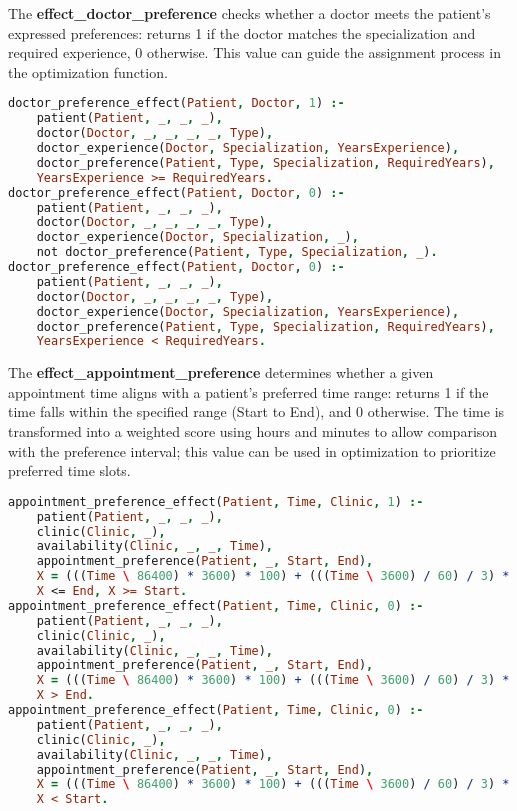 \documentclass{tlp}
\begin{document}
The  \textbf{effect\_doctor\_preference} checks whether a doctor meets the patient's expressed preferences: returns 1 if the doctor matches the specialization and required experience, 0 otherwise. This value can guide the assignment process in the optimization function.

\begin{lstlisting}[language=Prolog, caption=Effect of Patient Preference on Doctor Assignment]
doctor_preference_effect(Patient, Doctor, 1) :-
    patient(Patient, _, _, _), 
    doctor(Doctor, _, _, _, _, Type),
    doctor_experience(Doctor, Specialization, YearsExperience),
    doctor_preference(Patient, Type, Specialization, RequiredYears),
    YearsExperience >= RequiredYears.
doctor_preference_effect(Patient, Doctor, 0) :-
    patient(Patient, _, _, _), 
    doctor(Doctor, _, _, _, _, Type),
    doctor_experience(Doctor, Specialization, _),
    not doctor_preference(Patient, Type, Specialization, _).
doctor_preference_effect(Patient, Doctor, 0) :-
    patient(Patient, _, _, _), 
    doctor(Doctor, _, _, _, _, Type),
    doctor_experience(Doctor, Specialization, YearsExperience),
    doctor_preference(Patient, Type, Specialization, RequiredYears),
    YearsExperience < RequiredYears.
\end{lstlisting}

The \textbf{effect\_appointment\_preference} determines whether a given appointment time aligns with a patient's preferred time range: returns 1 if the time falls within the specified range (Start to End), and 0 otherwise.
The time is transformed into a weighted score using hours and minutes to allow comparison with the preference interval; this value can be used in optimization to prioritize preferred time slots.

\begin{lstlisting}[language=Prolog, caption=Effect of Time Preference on Appointment Scheduling]
appointment_preference_effect(Patient, Time, Clinic, 1) :-
    patient(Patient, _, _, _), 
    clinic(Clinic, _),
    availability(Clinic, _, _, Time),
    appointment_preference(Patient, _, Start, End),
    X = (((Time \ 86400) * 3600) * 100) + (((Time \ 3600) / 60) / 3) * 5,
    X <= End, X >= Start.
appointment_preference_effect(Patient, Time, Clinic, 0) :-
    patient(Patient, _, _, _), 
    clinic(Clinic, _),
    availability(Clinic, _, _, Time),
    appointment_preference(Patient, _, Start, End),
    X = (((Time \ 86400) * 3600) * 100) + (((Time \ 3600) / 60) / 3) * 5,
    X > End.
appointment_preference_effect(Patient, Time, Clinic, 0) :-
    patient(Patient, _, _, _), 
    clinic(Clinic, _),
    availability(Clinic, _, _, Time),
    appointment_preference(Patient, _, Start, End),
    X = (((Time \ 86400) * 3600) * 100) + (((Time \ 3600) / 60) / 3) * 5,
    X < Start.
\end{lstlisting}
\end{document}
